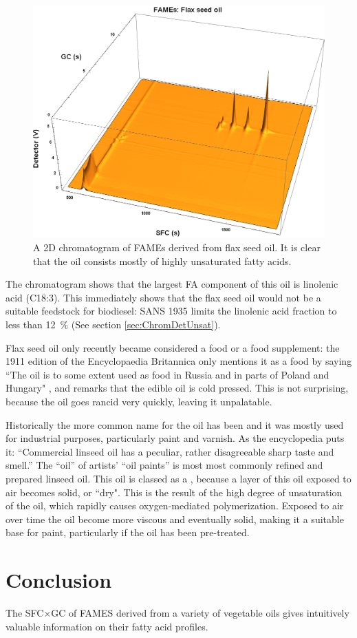 \begin{figure}
\centering
\includegraphics[width=\textwidth]{Figures/Flax44.png}
\decoRule

\caption[SFC×GC of flax seed oil]{A 2D chromatogram of FAMEs derived from
flax seed oil. It is clear that the oil consists mostly of highly unsaturated fatty
acids.}

\label{fig:2DFlax}
\end{figure}

The chromatogram shows that the largest FA component of this oil is linolenic
acid (C18:3). This immediately shows that the flax seed oil would not be a
suitable feedstock for biodiesel: SANS 1935 limits the linolenic acid fraction
to less than \SI{12}{\percent} (See section \ref{sec:ChromDetUnsat}).

Flax seed oil only recently became considered a food or a food supplement: the
1911 edition of the Encyclopaedia Britannica only mentions it as a food by
saying ``The oil is to some extent used as food in Russia and in parts of Poland
and Hungary" \autocite{Linseed1911}, and remarks that the edible oil is cold
pressed. This is not surprising, because the oil goes rancid very quickly,
leaving it unpalatable. 

Historically the more common name for the oil has been  and
it was mostly used for industrial purposes, particularly paint and varnish.
As the encyclopedia puts it: ``Commercial linseed oil has a peculiar, rather
disagreeable sharp taste and smell.'' The ``oil'' of artists' ``oil paints'' is
most most commonly refined and prepared linseed oil. This oil is classed as a
, because a layer of this oil exposed to air becomes solid,
or ``dry". This is the result of the high degree of unsaturation of the oil,
which rapidly causes oxygen-mediated polymerization. Exposed to air over time
the oil become more viscous and eventually solid, making it a suitable base for
paint, particularly if the oil has been pre-treated.

\section{Conclusion}

The SFC×GC of FAMES derived from a variety of vegetable oils gives intuitively
valuable information on their fatty acid profiles.

\todos